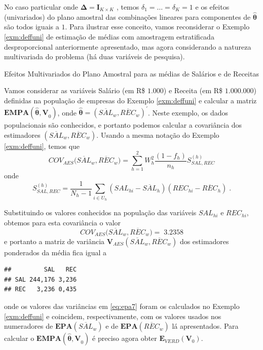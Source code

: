 \documentclass[]{book}
\theoremstyle{definition}
\theoremstyle{definition}
\theoremstyle{definition}
\theoremstyle{remark}
\let\BeginKnitrBlock\begin \let\EndKnitrBlock\end
\begin{document}
No caso particular onde \(\mathbf{\Delta =I}_{K\times K}\) , temos
\(\delta_{1}=\ldots =\delta _{K}=1\) e os efeitos (univariados) do plano
amostral das combinações lineares para componentes de
\(\mathbf{\hat{\theta}}\) são todos iguais a \(1\). Para ilustrar esse
conceito, vamos reconsiderar o Exemplo \ref{exm:deffuni} de estimação de
médias com amostragem estratificada desproporcional anteriormente
apresentado, mas agora considerando a natureza multivariada do problema
(há duas variáveis de pesquisa).

\BeginKnitrBlock{example}
\protect\hypertarget{exm:deffmult}{}{\label{exm:deffmult} }Efeitos
Multivariados do Plano Amostral para as médias de Salários e de Receitas
\EndKnitrBlock{example}

Vamos considerar as variáveis Salário (em R\$ \(1.000\)) e Receita (em
R\$ \(1.000.000\)) definidas na população de empresas do Exemplo
\ref{exm:deffuni} e calcular a matriz
\(\mathbf{EMPA}\left( \mathbf{\hat{\theta},V}_{0}\right)\), onde
\(\mathbf{\hat{\theta}=}\left( \overline{SAL}_{w},\overline{REC}_{w}\right) ^{\prime }\).
Neste exemplo, os dados populacionais são conhecidos, e portanto podemos
calcular a covariância dos estimadores
\(\left( \overline{SAL}_{w},\overline{REC}_{w}\right)\). Usando a mesma
notação do Exemplo \ref{exm:deffuni}, temos que \[
COV_{AES}(\overline{SAL}_{w},\overline{REC}_{w}\mathbf{)=}\sum\limits_{h=1}^{2}W_{h}^{2}\frac{\left( 1-f_{h}\right) }{n_{h}}S_{SAL,REC}^{\left( h\right) } 
\] onde \[
S_{SAL,REC}^{\left( h\right) }=\frac{1}{N_{h}-1}\sum\limits_{i\in
U_{h}}\left( SAL_{hi}-\overline{SAL}_{h}\right) \left( REC_{hi}-\overline{REC
}_{h}\right) \;. 
\]

Substituindo os valores conhecidos na população das variáveis
\(SAL_{hi}\) e \(REC_{hi}\), obtemos para esta covariância o valor \[
COV_{AES}(\overline{SAL}_{w},\overline{REC}_{w}\mathbf{)=\;}3.2358
\] e portanto a matriz de variância
\(\mathbf{V}_{AES}(\overline{SAL}_{w},\overline{REC}_{w})\) dos
estimadores ponderados da média fica igual a

\begin{verbatim}
##         SAL   REC
## SAL 244,176 3,236
## REC   3,236 0,435
\end{verbatim}

onde os valores das variâncias em \eqref{eq:epa7} foram os calculados no
Exemplo \ref{exm:deffuni} e coincidem, respectivamente, com os valores
usados nos numeradores de
\(\mathbf{EPA}\left( \overline{SAL}_{w}\right)\) e de
\(\mathbf{EPA}\left( \overline{REC}_{w}\right)\) lá apresentados. Para
calcular o \(\mathbf{EMPA}(\mathbf{\hat{\theta},V}_{0})\) é preciso
agora obter \(\mathbf{E}_{VERD}\left(\mathbf{V}_{0}\right)\).
\end{document}
